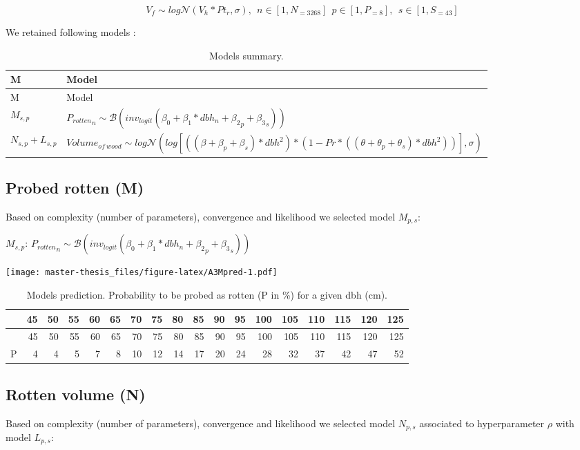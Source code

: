 \documentclass[12pt,]{article}
\theoremstyle{definition}
\theoremstyle{definition}
\theoremstyle{remark}
\begin{document}
\[V_f \sim log\mathcal{N}(V_h*Pt_r, \sigma), ~~n \in [1,N_{=3268}] ~~ p \in [1, P_{=8}], ~~ s \in [1, S_{=43}]\]

We retained following models :

\begin{longtable}[]{@{}ll@{}}
\caption{\label{tab:A3models}Models summary.}\tabularnewline
\toprule
M & Model\tabularnewline
\midrule
\endfirsthead
\toprule
M & Model\tabularnewline
\midrule
\endhead
\(M_{s,p}\) &
\({P_{rotten}}_n \sim \mathcal{B}(inv_{logit}(\beta_0 + \beta_1*dbh_n + {\beta_2}_p + {\beta_3}_s))\)\tabularnewline
\(N_{s,p} + L_{s,p}\) &
\(Volume_{of~wood} \sim log\mathcal{N} (log[((\beta + \beta_p + \beta_s)*dbh^2)*(1 - Pr*((\theta + \theta_p + \theta_s) *dbh^2))], \sigma)\)\tabularnewline
\bottomrule
\end{longtable}

\subsection{Probed rotten (M)}\label{probed-rotten-m}

Based on complexity (number of parameters), convergence and likelihood
we selected model \(M_{p,s}\):

\(M_{s,p}\):
\({P_{rotten}}_n \sim \mathcal{B}(inv_{logit}(\beta_0 + \beta_1*dbh_n + {\beta_2}_p + {\beta_3}_s))\)

\texttt{[image: master-thesis\_files/figure-latex/A3Mpred-1.pdf]}

\begin{longtable}[]{@{}lrrrrrrrrrrrrrrrrr@{}}
\caption{\label{tab:A3Mtab}Models prediction. Probability to be probed as
rotten (P in \%) for a given dbh (cm).}\tabularnewline
\toprule
& 45 & 50 & 55 & 60 & 65 & 70 & 75 & 80 & 85 & 90 & 95 & 100 & 105 & 110
& 115 & 120 & 125\tabularnewline
\midrule
\endfirsthead
\toprule
& 45 & 50 & 55 & 60 & 65 & 70 & 75 & 80 & 85 & 90 & 95 & 100 & 105 & 110
& 115 & 120 & 125\tabularnewline
\midrule
\endhead
P & 4 & 4 & 5 & 7 & 8 & 10 & 12 & 14 & 17 & 20 & 24 & 28 & 32 & 37 & 42
& 47 & 52\tabularnewline
\bottomrule
\end{longtable}

\subsection{Rotten volume (N)}\label{rotten-volume-n}

Based on complexity (number of parameters), convergence and likelihood
we selected model \(N_{p,s}\) associated to hyperparameter \(\rho\) with
model \(L_{p,s}\):
\end{document}
